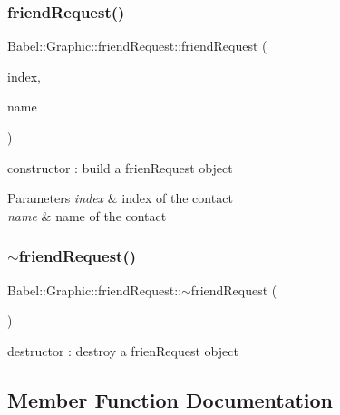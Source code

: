\subsubsection{\texorpdfstring{friend\+Request()}{friendRequest()}}
{\footnotesize\ttfamily Babel\+::\+Graphic\+::friend\+Request\+::friend\+Request (\begin{DoxyParamCaption}\item[{qint32}]{index,  }\item[{Q\+String}]{name }\end{DoxyParamCaption})}

constructor \+: build a frien\+Request object 
\begin{DoxyParams}{Parameters}
{\em index} & index of the contact \\
\hline
{\em name} & name of the contact \\
\hline
\end{DoxyParams}
\mbox{\label{classBabel_1_1Graphic_1_1friendRequest_aa96c9a4fcc9b4785ac29aade4f828e3f}} 
\subsubsection{\texorpdfstring{$\sim$friend\+Request()}{~friendRequest()}}
{\footnotesize\ttfamily Babel\+::\+Graphic\+::friend\+Request\+::$\sim$friend\+Request (\begin{DoxyParamCaption}{ }\end{DoxyParamCaption})\hspace{0.3cm}{\ttfamily [default]}}

destructor \+: destroy a frien\+Request object 

\subsection{Member Function Documentation}
\mbox{\label{classBabel_1_1Graphic_1_1friendRequest_a18aec35b92565f5259d31f73ea6aafb7}} 
